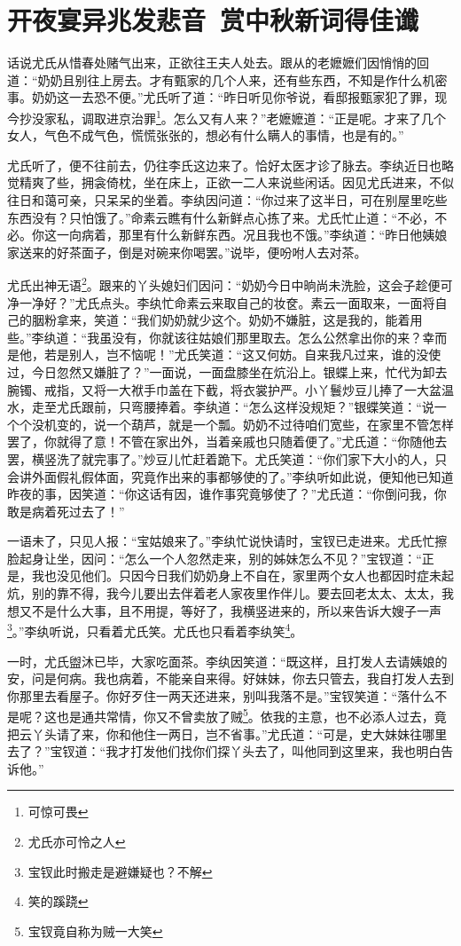 \documentclass[12pt,oneside]{book}
\begin{document}
\chapter{开夜宴异兆发悲音~赏中秋新词得佳谶}
话说尤氏从惜春处赌气出来，正欲往王夫人处去。跟从的老嬷嬷们因悄悄的回道：“奶奶且别往上房去。才有甄家的几个人来，还有些东西，不知是作什么机密事。奶奶这一去恐不便。”尤氏听了道：“昨日听见你爷说，看邸报甄家犯了罪，现今抄没家私，调取进京治罪\footnote{可惊可畏}。怎么又有人来？”老嬷嬷道：“正是呢。才来了几个女人，气色不成气色，慌慌张张的，想必有什么瞒人的事情，也是有的。”

尤氏听了，便不往前去，仍往李氏这边来了。恰好太医才诊了脉去。李纨近日也略觉精爽了些，拥衾倚枕，坐在床上，正欲一二人来说些闲话。因见尤氏进来，不似往日和蔼可亲，只呆呆的坐着。李纨因问道：“你过来了这半日，可在别屋里吃些东西没有？只怕饿了。”命素云瞧有什么新鲜点心拣了来。尤氏忙止道：“不必，不必。你这一向病着，那里有什么新鲜东西。况且我也不饿。”李纨道：“昨日他姨娘家送来的好茶面子，倒是对碗来你喝罢。”说毕，便吩咐人去对茶。

尤氏出神无语\footnote{尤氏亦可怜之人}。跟来的丫头媳妇们因问：“奶奶今日中晌尚未洗脸，这会子趁便可净一净好？”尤氏点头。李纨忙命素云来取自己的妆奁。素云一面取来，一面将自己的胭粉拿来，笑道：“我们奶奶就少这个。奶奶不嫌脏，这是我的，能着用些。”李纨道：“我虽没有，你就该往姑娘们那里取去。怎么公然拿出你的来？幸而是他，若是别人，岂不恼呢！”尤氏笑道：“这又何妨。自来我凡过来，谁的没使过，今日忽然又嫌脏了？”一面说，一面盘膝坐在炕沿上。银蝶上来，忙代为卸去腕镯、戒指，又将一大袱手巾盖在下截，将衣裳护严。小丫鬟炒豆儿捧了一大盆温水，走至尤氏跟前，只弯腰捧着。李纨道：“怎么这样没规矩？”银蝶笑道：“说一个个没机变的，说一个葫芦，就是一个瓢。奶奶不过待咱们宽些，在家里不管怎样罢了，你就得了意！不管在家出外，当着亲戚也只随着便了。”尤氏道：“你随他去罢，横竖洗了就完事了。”炒豆儿忙赶着跪下。尤氏笑道：“你们家下大小的人，只会讲外面假礼假体面，究竟作出来的事都够使的了。”李纨听如此说，便知他已知道昨夜的事，因笑道：“你这话有因，谁作事究竟够使了？”尤氏道：“你倒问我，你敢是病着死过去了！”

一语未了，只见人报：“宝姑娘来了。”李纨忙说快请时，宝钗已走进来。尤氏忙擦脸起身让坐，因问：“怎么一个人忽然走来，别的姊妹怎么不见？”宝钗道：“正是，我也没见他们。只因今日我们奶奶身上不自在，家里两个女人也都因时症未起炕，别的靠不得，我今儿要出去伴着老人家夜里作伴儿。要去回老太太、太太，我想又不是什么大事，且不用提，等好了，我横竖进来的，所以来告诉大嫂子一声\footnote{宝钗此时搬走是避嫌疑也？不解}。”李纨听说，只看着尤氏笑。尤氏也只看着李纨笑\footnote{笑的蹊跷}。

一时，尤氏盥沐已毕，大家吃面茶。李纨因笑道：“既这样，且打发人去请姨娘的安，问是何病。我也病着，不能亲自来得。好妹妹，你去只管去，我自打发人去到你那里去看屋子。你好歹住一两天还进来，别叫我落不是。”宝钗笑道：“落什么不是呢？这也是通共常情，你又不曾卖放了贼\footnote{宝钗竟自称为贼一大笑}。依我的主意，也不必添人过去，竟把云丫头请了来，你和他住一两日，岂不省事。”尤氏道：“可是，史大妹妹往哪里去了？”宝钗道：“我才打发他们找你们探丫头去了，叫他同到这里来，我也明白告诉他。”
\end{document}
